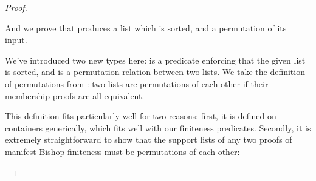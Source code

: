 \begin{proof}
\begin{minipage}{\linewidth}
\begin{multicols}{2}
  \begin{agdalisting*}
  \end{agdalisting*} \columnbreak \vfill \null \vfill
  \begin{agdalisting*}
  \end{agdalisting*} \vfill \null
\end{multicols}
\end{minipage} \noindent
And we prove that  produces a list which is sorted, and a
permutation of its input.
\begin{multicols}{2}
  \begin{agdalisting*}
  \end{agdalisting*} \columnbreak
  \begin{agdalisting*}
  \end{agdalisting*}
\end{multicols} \vspace{-\baselineskip}
We've introduced two new types here:  is a predicate
enforcing that the given list is sorted, and
\AgdaFunction{\(\leftrightsquigarrow\)} is a permutation relation between two
lists.
We take the definition of permutations from
\citep{danielssonBagEquivalenceProofRelevant2012}: two lists are permutations of
each other if their membership proofs are all equivalent.
\begin{agdalisting*}
\end{agdalisting*}
This definition fits particularly well for two reasons: first, it is defined on
containers generically, which fits well with our finiteness predicates.
Secondly, it is extremely straightforward to show that the support lists of any
two proofs of manifest Bishop finiteness must be permutations of each other:
\begin{agdalisting*}
\end{agdalisting*}


\end{proof}
